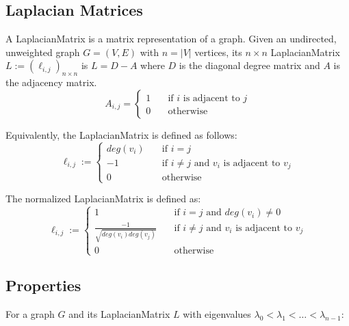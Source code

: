 \subsection{Laplacian Matrices}
\nocite{BERKEYLEY99}
A \gls{LaplacianMatrix} is a matrix representation of a graph. Given an 
undirected, unweighted graph $G = (V, E)$ with $n=|V|$ vertices, its 
$n{\times}n$ \gls{LaplacianMatrix} $L := ({\ell}_{i,j})_{n{\times}n}$ is 
$L = D - A$ where $D$ is the diagonal degree matrix and $A$ is the adjacency 
matrix.
\begin{displaymath}
A_{i,j} =
    \left\{
        \begin{array}{ll}
            1 & \quad \text{if $i$ is adjacent to $j$} \\
            0 & \quad \text{otherwise}
        \end{array}
    \right.
\end{displaymath}

Equivalently, the \gls{LaplacianMatrix} is defined as follows:
\begin{displaymath}
{\ell}_{i,j} := 
    \left\{
        \begin{array}{ll}
            deg(v_{i}) &    \quad \text{if $i = j$} \\
            -1 &            \quad \text{if $i \neq j$ and $v_{i}$ is adjacent to $v_{j}$} \\
            0 &             \quad \text{otherwise}
        \end{array}
    \right.
\end{displaymath}

The normalized \gls{LaplacianMatrix} is defined as:
\begin{displaymath}
{\ell}_{i,j} := 
    \left\{
        \begin{array}{ll}
            1 &                                             \quad \text{if $i = j$ and $deg(v_{i}) \neq 0$} \\
            \frac{-1}{\sqrt{deg(v_{i})deg(v_{j})}} & \quad  \text{if $i \neq j$ and $v_{i}$ is adjacent to $v_{j}$} \\
            0 &                                             \quad \text{otherwise}
        \end{array}
    \right.
\end{displaymath}

\subsection{Properties}
For a graph $G$ and its \gls{LaplacianMatrix} $L$ with eigenvalues 
$\lambda_{0} < \lambda_{1} < \ldots < \lambda_{n-1}$:

